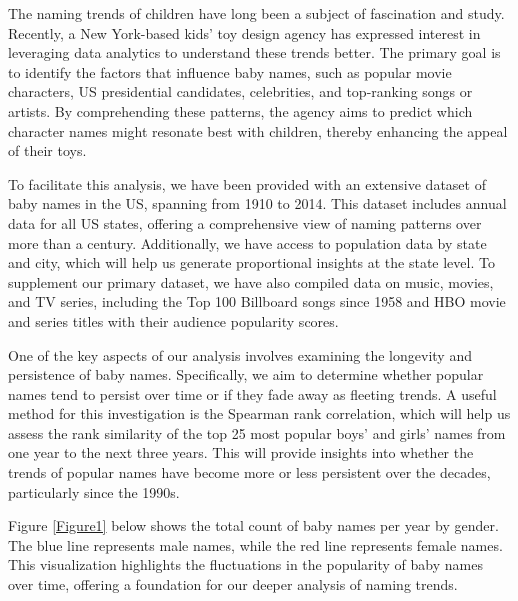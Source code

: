 \documentclass[11pt,preprint, authoryear]{elsarticle}
\numberwithin{equation}{section}
\numberwithin{figure}{section}
\numberwithin{table}{section}
\begin{document}
The naming trends of children have long been a subject of fascination
and study. Recently, a New York-based kids' toy design agency has
expressed interest in leveraging data analytics to understand these
trends better. The primary goal is to identify the factors that
influence baby names, such as popular movie characters, US presidential
candidates, celebrities, and top-ranking songs or artists. By
comprehending these patterns, the agency aims to predict which character
names might resonate best with children, thereby enhancing the appeal of
their toys.

To facilitate this analysis, we have been provided with an extensive
dataset of baby names in the US, spanning from 1910 to 2014. This
dataset includes annual data for all US states, offering a comprehensive
view of naming patterns over more than a century. Additionally, we have
access to population data by state and city, which will help us generate
proportional insights at the state level. To supplement our primary
dataset, we have also compiled data on music, movies, and TV series,
including the Top 100 Billboard songs since 1958 and HBO movie and
series titles with their audience popularity scores.

One of the key aspects of our analysis involves examining the longevity
and persistence of baby names. Specifically, we aim to determine whether
popular names tend to persist over time or if they fade away as fleeting
trends. A useful method for this investigation is the Spearman rank
correlation, which will help us assess the rank similarity of the top 25
most popular boys' and girls' names from one year to the next three
years. This will provide insights into whether the trends of popular
names have become more or less persistent over the decades, particularly
since the 1990s.

Figure \ref{Figure1} below shows the total count of baby names per year
by gender. The blue line represents male names, while the red line
represents female names. This visualization highlights the fluctuations
in the popularity of baby names over time, offering a foundation for our
deeper analysis of naming trends.
\end{document}

